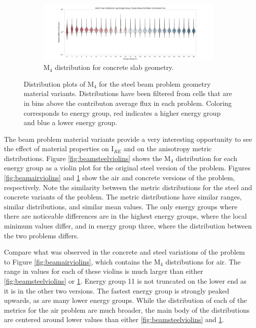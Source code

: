 \begin{figure}[htb!]\ContinuedFloat
  \centering
  \begin{subfigure}[t]{\textwidth}
    \includegraphics[width=\linewidth]{./chapters/characterization_probs/figures/char/prob1v2/metric_four_violin_mean.pdf}
    \caption{M$_4$ distribution for concrete slab geometry.}
    \label{fig:beamconcreteviolins}
  \end{subfigure}
  \caption[Distribution plots of M$_4$ for the steel beam problem geometry
  material variants.]{Distribution plots of M$_4$ for the steel beam problem
  geometry material variants. Distributions have been filtered from cells that
  are in bins above the contributon average flux in each problem. Coloring
corresponds to energy group, red indicates a higher energy group and blue a
lower energy group. }
  \label{fig:beamviolins}
\end{figure}

The beam problem material variants provide a very interesting opportunity to see
the effect of material properties on I$_{RE}$ and on the anisotropy metric
distributions. 
Figure \ref{fig:beamsteelviolins} shows the M$_4$ distribution for each energy
group as a violin plot for the original steel version of the problem.
Figures \ref{fig:beamairviolins} and \ref{fig:beamconcreteviolins} show the air
and concrete versions of the problem, respectively. Note the similarity between
the metric distributions for the steel and concrete variants of the problem. The metric
distributions have similar ranges, similar distributions, and similar mean
values. The only energy groups where there are noticeable differences are in the
highest energy groups, where the local minimum values differ, and in energy
group three, where the distribution between the two problems differs.

Compare
what was observed in the concrete and steel variations of the problem
to Figure \ref{fig:beamairviolins}, which contains the M$_4$ distributions
for air. The range in values for each of these violins is much larger than
either \ref{fig:beamsteelviolins} or \ref{fig:beamconcreteviolins}. Energy group
11 is not truncated on the lower end as it is in the other two versions. The fastest
energy group is strongly peaked upwards, as are many lower energy groups. While
the distribution of each of the metrics for the air problem are much broader, the
main body of the distributions are centered around lower values than either
\ref{fig:beamsteelviolins} and \ref{fig:beamconcreteviolins}.

